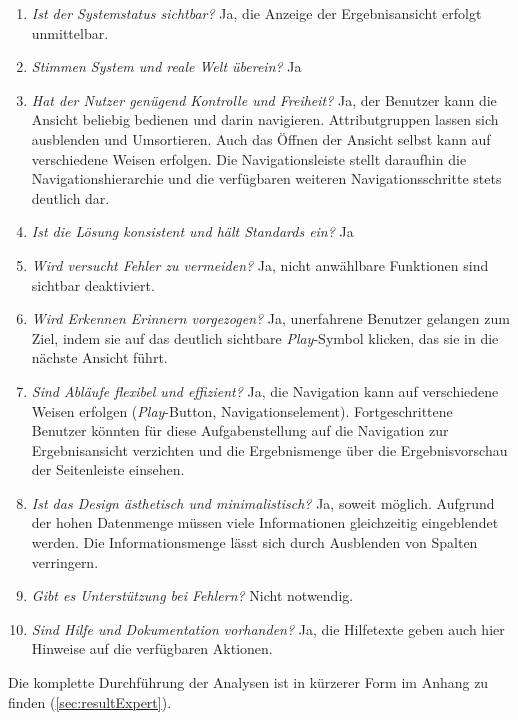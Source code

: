\begin{enumerate}
 \item \textit{Ist der Systemstatus sichtbar?} Ja, die Anzeige der Ergebnisansicht erfolgt unmittelbar.
 \item \textit{Stimmen System und reale Welt überein?} Ja
 \item \textit{Hat der Nutzer genügend Kontrolle und Freiheit?} Ja, der Benutzer kann die Ansicht beliebig bedienen und darin navigieren. Attributgruppen lassen sich ausblenden und Umsortieren. Auch das Öffnen der Ansicht selbst kann auf verschiedene Weisen erfolgen. Die Navigationsleiste stellt daraufhin die Navigationshierarchie und die verfügbaren weiteren Navigationsschritte stets deutlich dar.
 \item \textit{Ist die Lösung konsistent und hält Standards ein?} Ja
 \item \textit{Wird versucht Fehler zu vermeiden?} Ja, nicht anwählbare Funktionen sind sichtbar deaktiviert.
 \item \textit{Wird Erkennen Erinnern vorgezogen?} Ja, unerfahrene Benutzer gelangen zum Ziel, indem sie auf das deutlich sichtbare \textit{Play}-Symbol klicken, das sie in die nächste Ansicht führt.
 \item \textit{Sind Abläufe flexibel und effizient?} Ja, die Navigation kann auf verschiedene Weisen erfolgen (\textit{Play}-Button, Navigationselement). Fortgeschrittene Benutzer könnten für diese Aufgabenstellung auf die Navigation zur Ergebnisansicht verzichten und die Ergebnismenge über die Ergebnisvorschau der Seitenleiste einsehen.
 \item \textit{Ist das Design ästhetisch und minimalistisch?} Ja, soweit möglich. Aufgrund der hohen Datenmenge müssen viele Informationen gleichzeitig eingeblendet werden. Die Informationsmenge lässt sich durch Ausblenden von Spalten verringern.
 \item \textit{Gibt es Unterstützung bei Fehlern?} Nicht notwendig.
 \item \textit{Sind Hilfe und Dokumentation vorhanden?} Ja, die Hilfetexte geben auch hier Hinweise auf die verfügbaren Aktionen.
\end{enumerate}
Die komplette Durchführung der Analysen ist in kürzerer Form im Anhang zu finden (\ref{sec:resultExpert}).\par
